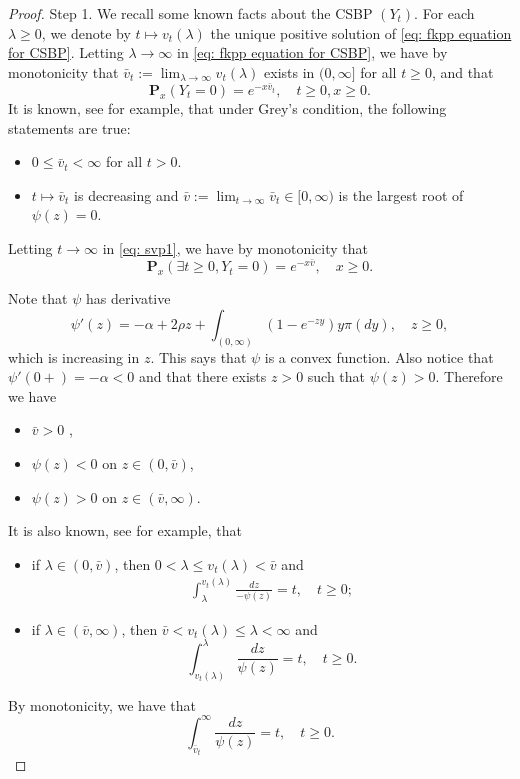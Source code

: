 \documentclass[12pt,a4paper]{amsart}
\theoremstyle{plain}
\theoremstyle{definition}
\numberwithin{equation}{section}
\begin{document}
\begin{proof}
    Step 1. We recall some known facts about the CSBP $(Y_t)$.
       For each $\lambda \geq 0$, we denote by $t\mapsto v_t(\lambda)$ the unique positive solution of \eqref{eq: fkpp equation for CSBP}.
    Letting $\lambda \to \infty$ in \eqref{eq: fkpp equation for CSBP}, we have by monotonicity that $\bar v_t:= \lim_{\lambda \to \infty}v_t(\lambda)$ exists in $(0,\infty]$ for all $t\geq 0$, and that
\begin{equation}
\label{eq: svp1}
    \mathbf P_x(Y_t = 0)=e^{-x\bar v_t}, \quad t\geq 0, x\ge 0.
\end{equation}
    It is known, see \cite[Theorems 3.5--3.8]{Li2011Measure-valued} for example, that under Grey's condition, the following statements are true:
\begin{itemize}
\item
    $0\leq \bar v_t < \infty$ for all $t>0$.
\item
    $t\mapsto \bar v_t$ is decreasing and $\bar v:= \lim_{t\to \infty} \bar v_t \in [0,\infty)$ is the largest root of $\psi(z) = 0$.
\end{itemize}
    Letting $t \to \infty$ in \eqref{eq: svp1}, we have by monotonicity that
\[
    \mathbf P_x(\exists t \geq 0, Y_t = 0)
    = e^{-x\bar v}, \quad x\geq 0.
\]

    Note that $\psi$ has derivative
\[
    \psi'(z)
    = -\alpha + 2\rho z + \int_{(0,\infty)}(1-e^{-zy})y\pi(dy),\quad z\geq 0,
\]
    which is increasing in $z$.
    This says that $\psi$ is a convex function.
    Also notice that $\psi'(0+)=-\alpha <0$ and that there exists $z>0$ such that $\psi(z)>0$.
    Therefore we have
\begin{itemize}
\item
    $\bar v > 0$ ,
\item
    $\psi(z) < 0$ on $z\in (0,\bar v)$,
\item
    $\psi(z) > 0 $ on $z\in (\bar v, \infty)$.
\end{itemize}
    It is also known, see \cite[Proposition 3.3]{Li2011Measure-valued} for example, that
\begin{itemize}
\item
    if $\lambda \in (0,\bar v)$, then $0<\lambda \leq v_t(\lambda)<\bar v $ and
\begin{align}
\label{CSBP: int}
    \int_{\lambda}^{v_t(\lambda)} \frac{dz}{-\psi(z)} = t, \quad t\geq 0;
\end{align}
\item
    if $\lambda \in (\bar v, \infty)$, then $\bar v < v_t(\lambda)\leq \lambda< \infty $ and
\[
  \int_{v_t(\lambda)}^\lambda\frac{dz}{\psi(z)} = t, \quad t\geq 0.
\]
\end{itemize}
    By monotonicity, we have that
\begin{equation}
\label{eq:svp2}
    \int_{\bar v_t}^\infty \frac{dz}{\psi(z)} = t, \quad t\geq 0.
\end{equation}


\end{proof}
\end{document}
